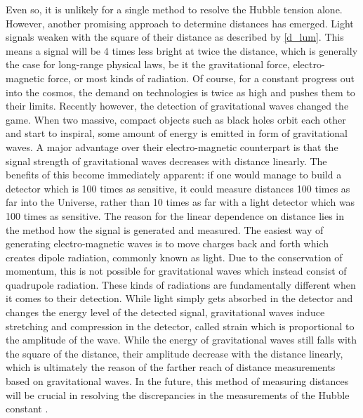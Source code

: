 Even so, it is unlikely for a single method to resolve the Hubble tension alone.
However, another promising approach to determine distances has emerged.  Light
signals weaken with the square of their distance as described by \eqref{d_lum}.
This means a signal will be 4 times less bright at twice the distance, which is
generally the case for long-range physical laws, be it the gravitational force,
electro-magnetic force, or most kinds of radiation.  Of course, for a constant
progress out into the cosmos, the demand on technologies is twice as high and
pushes them to their limits.  Recently however, the detection of gravitational
waves changed the game.  When two massive, compact objects such as black holes
orbit each other and start to inspiral, some amount of energy is emitted in form
of gravitational waves.  A major
advantage over their electro-magnetic counterpart is that the signal strength of
gravitational waves decreases with distance linearly.  The benefits of this
become immediately apparent: if one would manage to build a detector which is
100 times as sensitive, it could measure distances 100 times as far into the
Universe, rather than 10 times as far with a light detector which was 100 times
as sensitive.  The reason for the linear dependence on distance lies in the
method how the signal is generated and measured.  The easiest way of generating
electro-magnetic waves is to move charges back and forth which creates dipole
radiation, commonly known as light.  Due to the conservation of momentum, this
is not possible for gravitational waves which instead consist of quadrupole
radiation.  These kinds of radiations are fundamentally different when it comes
to their detection.  While light simply gets absorbed in the detector and
changes the energy level of the detected signal, gravitational waves induce
stretching and compression in the detector, called strain which is proportional
to the amplitude of the wave.  While the energy of gravitational waves still
falls with the square of the distance, their amplitude decrease with the
distance linearly, which is ultimately the reason of the farther reach of
distance measurements based on gravitational waves.  In the future, this method
of measuring distances will be crucial in resolving the discrepancies in the
measurements of the Hubble constant .
